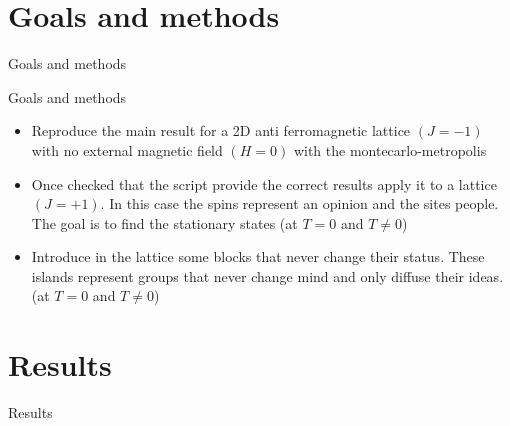 \documentclass{beamer}
\begin{document}
\section{Goals and methods}

\begin{frame}
\begin{center}
{\Huge Goals and methods}
\end{center}
\end{frame}

\begin{frame}{Goals and methods}
\begin{itemize}
\item Reproduce the main result for a 2D anti ferromagnetic lattice $(J=-1)$ with no external magnetic field $(H=0)$ with the montecarlo-metropolis
\item  Once checked that the script provide the correct results apply it to a lattice $(J=+1)$.  In this case the spins represent an opinion and the sites people.  The goal is to find the stationary states (at $T=0$ and $T\neq0$)
\item Introduce in the lattice some blocks that never change their status.  These islands represent groups that never change mind and only diffuse their ideas.  (at $T=0$ and $T\neq0$)
\end{itemize}
\end{frame}

\section{Results}

\begin{frame}
\begin{center}
{\Huge Results}
\end{center}
\end{frame}
\end{document}
